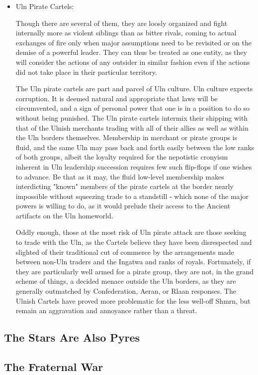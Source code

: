 \begin{itemize}
\item Uln Pirate Cartels:

Though there are several of them, they are loosly organized and fight
internally more as violent siblings than as bitter rivals, coming to
actual exchanges of fire only when major assumptions need to be
revisited or on the demise of a powerful leader. They can thus be
treated as one entity, as they will consider the actions of any
outsider in similar fashion even if the actions did not take place in
their particular territory.

The Uln pirate cartels are part and parcel of Uln culture. Uln culture
expects corruption. It is deemed natural and appropriate that laws
will be circumvented, and a sign of personal power that one is in a
position to do so without being punished. The Uln pirate cartels
intermix their shipping with that of the Ulnish merchants trading with
all of their allies as well as within the Uln borders
themselves. Membership in merchant or pirate groups is fluid, and the
same Uln may pass back and forth easily between the low ranks of both
groups, albeit the loyalty required for the nepotistic cronyism
inherent in Uln leadership succession requires few such flip-flops if
one wishes to advance. Be that as it may, the fluid low-level
membership makes interdicting "known" members of the pirate cartels at
the border nearly impossible without squeezing trade to a standstill -
which none of the major powers is willing to do, as it would prelude
their access to the Ancient artifacts on the Uln homeworld.

Oddly enough, those at the most risk of Uln pirate attack are those
seeking to trade with the Uln, as the Cartels believe they have been
disrespected and slighted of their traditional cut of commerce by the
arrangements made between non-Uln traders and the Ingatwa and ranks of
royals. Fortunately, if they are particularly well armed for a pirate
group, they are not, in the grand scheme of things, a decided menace
outside the Uln borders, as they are generally outmatched by
Confederation, Aeran, or Rlaan responses. The Ulnish Cartels have
proved more problematic for the less well-off Shmrn, but remain an
aggravation and annoyance rather than a threat.
\end{itemize}
\subsection{The Stars Are Also Pyres}
\subsection{The Fraternal War}
